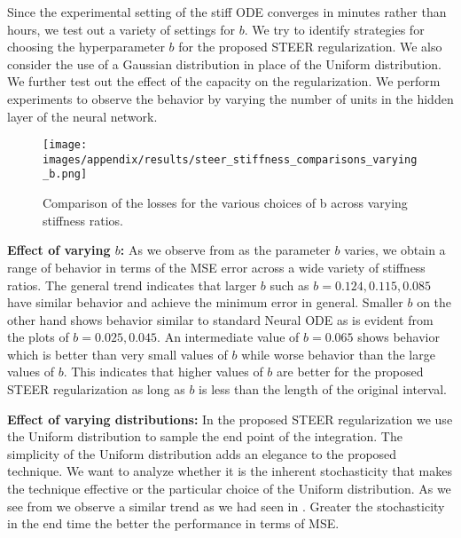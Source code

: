 Since the experimental setting of the stiff ODE converges in minutes rather than hours, we test out a variety of settings for $b$. We try to identify strategies for choosing the hyperparameter $b$ for the proposed STEER regularization. We also consider the use of a Gaussian distribution in place of the Uniform distribution. We further test out the effect of the capacity on the regularization. We perform experiments to observe the behavior by varying the number of units in the hidden layer of the neural network.

\begin{wrapfigure}[20]{r}{0.6\textwidth}
	\centering
	\texttt{[image: images/appendix/results/steer\_stiffness\_comparisons\_varying\_b.png]}
	\caption{Comparison of the losses for the various choices of b across varying stiffness ratios.} 
	\label{fig:steer_stiffness_comparisons_b_varying}
\end{wrapfigure}

\textbf{Effect of varying $b$:} As we observe from  as the parameter $b$ varies, we obtain a range of behavior in terms of the MSE error across a wide variety of stiffness ratios. The general trend indicates that larger $b$ such as $b=0.124,0.115,0.085$ have similar behavior and achieve the minimum error in general. Smaller $b$ on the other hand shows behavior similar to standard Neural ODE as is evident from the plots of $b=0.025,0.045$. An intermediate value of $b=0.065$ shows behavior which is better than very small values of $b$ while worse behavior than the large values of $b$. This indicates that higher values of $b$ are better for the proposed STEER regularization as long as $b$ is less than the length of the original interval. 





\textbf{Effect of varying distributions:} In the proposed STEER regularization we use the Uniform distribution to sample the end point of the integration. The simplicity of the Uniform distribution adds an elegance to the proposed technique. We want to analyze whether it is the inherent stochasticity that makes the technique effective or the particular choice of the Uniform distribution. As we see from  we observe a similar trend as we had seen in . Greater the stochasticity in the end time the better the performance in terms of MSE. 

